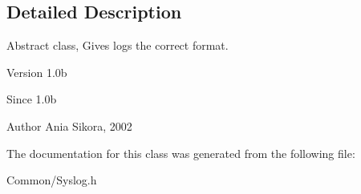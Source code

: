 \subsection{Detailed Description}
Abstract class, Gives logs the correct format. 

\begin{DoxyVersion}{Version}
1.\-0b 
\end{DoxyVersion}
\begin{DoxySince}{Since}
1.\-0b 
\end{DoxySince}
\begin{DoxyAuthor}{Author}
Ania Sikora, 2002 
\end{DoxyAuthor}


The documentation for this class was generated from the following file\-:\begin{DoxyCompactItemize}
\item 
Common/Syslog.\-h\end{DoxyCompactItemize}
